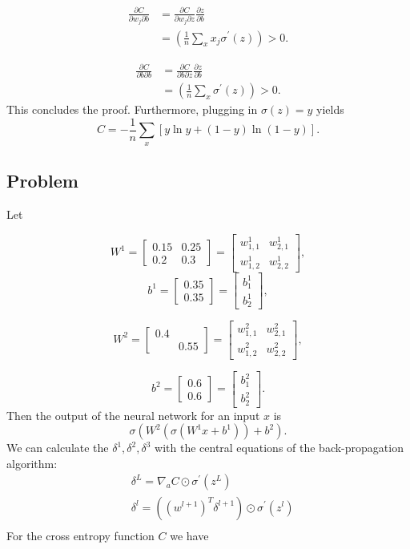 \documentclass{article}
\begin{document}
$$
\begin{aligned}
	\frac{\partial C}{\partial w_j\partial b}&=\frac{\partial C}{\partial w_j\partial z}\frac{\partial z}{\partial b}
	\\&=\left(\frac{1}{n} \sum_x x_j\sigma^{\prime}(z)\right)>0.
\end{aligned}
$$

$$
\begin{aligned}
	\frac{\partial C}{\partial b\partial b}&=\frac{\partial C}{\partial b\partial z}\frac{\partial z}{\partial b}
	\\&=\left(\frac{1}{n} \sum_x\sigma^{\prime}(z)\right)>0.
\end{aligned}
$$
This concludes the proof. Furthermore, plugging in $\sigma (z)=y$ yields 
$$
C=-\frac{1}{n} \sum_x[y \ln y+(1-y) \ln (1-y)].
$$
\subsection{Problem}
Let

$$
W^1=
\begin{bmatrix}
  0.15 & 0.25 \\
  0.2 & 0.3
\end{bmatrix}=\begin{bmatrix}
  w^1_{1,1} & w^1_{2,1} \\
  w^1_{1,2} & w^1_{2,2}
\end{bmatrix},
$$
$$
 b^1 = \begin{bmatrix}
  0.35  \\
  0.35 
\end{bmatrix}= \begin{bmatrix}
  b^1_1  \\
  b^1_2 
\end{bmatrix},
$$


$$
W^2=
\begin{bmatrix}
  0.4 &  \\
   & 0.55
\end{bmatrix}=\begin{bmatrix}
  w^2_{1,1} & w^2_{2,1} \\
  w^2_{1,2} & w^2_{2,2}
\end{bmatrix},
$$

$$
 b^2 = \begin{bmatrix}
  0.6  \\
  0.6 
\end{bmatrix}= \begin{bmatrix}
  b^2_1  \\
  b^2_2 
\end{bmatrix}.
$$
Then the output of the neural network for an input $x$ is 
$$\sigma(W^2(\sigma(W^1x+b^1))+b^2).$$
We can calculate the $\delta^1,\delta^2, \delta^3$ with the central equations of the back-propagation algorithm:
$$
\begin{aligned}
& \delta^L=\nabla_a C \odot \sigma^{\prime}\left(z^L\right) \\
& \delta^l=\left(\left(w^{l+1}\right)^T \delta^{l+1}\right) \odot \sigma^{\prime}\left(z^l\right) \\
\end{aligned}
$$
For the cross entropy function $C$ we have
\end{document}
